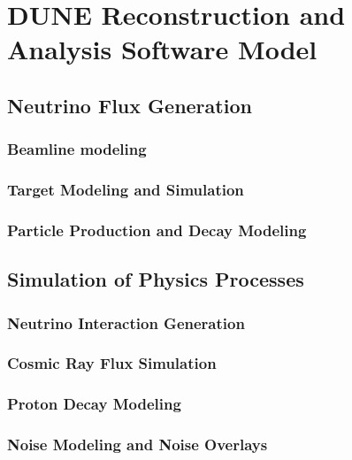 %
\chapter{DUNE Reconstruction and Analysis Software Model } 

\section{Neutrino Flux Generation}
\subsection{Beamline modeling}
\subsection{Target Modeling and Simulation}
\subsection{Particle Production and Decay Modeling}

\section{Simulation of Physics Processes}
\subsection{Neutrino Interaction Generation}
\subsection{Cosmic Ray Flux Simulation}
\subsection{Proton Decay Modeling}
\subsection{Noise Modeling and Noise Overlays}

